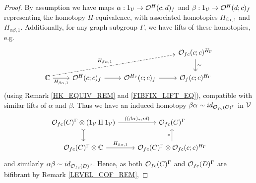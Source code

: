 \documentclass[a4paper,10pt
,draft
]{article}%
\renewcommand{\1}{\eta}%
\begin{document}
\begin{proof}
      By assumption we have maps
      $\alpha: 1_{\mathcal V} \to \mathcal{O}^H(c;d)_f$ and $\beta: 1_{\mathcal V} \to \mathcal{O}^H(d;c)_f$
      representing the homotopy $H$-equivalence,
      with associated homotopies $H_{\beta\alpha,1}$ and $H_{\alpha\beta,1}$.
      Additionally, for any graph subgroup $\Gamma$, we have lifts of these homotopies, e.g.
      \begin{equation}
            \label{OFC_HOM_LIFT}
            \begin{tikzcd}
                  &&& \O_{f c}(c;c)^{H_\Gamma} \arrow[d, two heads, "\sim"]
                  \\
                  \mathbb C \arrow[r, "H_{\beta\alpha,1}"'] \arrow[urrr, dashed, shift left, "H_{\beta\alpha,1}"]
                  &
                  \O^H(c;c)_f \arrow[r]
                  &
                  \O^{H_\Gamma}(c;c)_f \arrow[r]
                  &
                  \O_f(c;c)^{H_\Gamma}
            \end{tikzcd}
      \end{equation}
      (using Remark \ref{HK_EQUIV_REM} and \eqref{FIBFIX_LIFT_EQ}), compatible with similar lifts of $\alpha$ and $\beta$.
      Thus we have an induced homotopy $\beta\alpha \sim id_{\mathcal{O}_{f c}(C)^{\Gamma}}$ in $\mathcal V$
      \begin{equation}
            \begin{tikzcd}
                  \O_{f c}(C)^{\Gamma} \otimes (1_\V \amalg 1_\V) \arrow[d, tail] \arrow[r, "{((\beta\alpha)_{\**}, id)}"]
                  &
                  \O_{f c}(C)^\Gamma
                  \\                  
                  \O_{f c}(C)^\Gamma \otimes \mathbb C \arrow[r, "H_{\beta\alpha,1}"]
                  &
                  \O_{f c}(C)^\Gamma \otimes \O_{f c}(c;c)^{H_\Gamma} \arrow[u, "\circ"]
            \end{tikzcd}
      \end{equation}
      and similarly $\alpha\beta \sim id_{\mathcal{O}_{f c}(D)^\Gamma}$.
      Hence, as both $\mathcal{O}_{f c}(C)^\Gamma$ and $\mathcal{O}_{f c}(D)^\Gamma$ are bifibrant by Remark \ref{LEVEL_COF_REM},

\end{proof}
\end{document}
